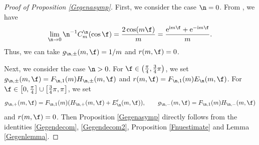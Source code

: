 \begin{proof}[Proof of Proposition \ref{Gegenasymp}]
First, we consider the case $\n=0$. From \cite[equation~(4.28)]{BKO}, we have
\begin{align*}
\lim_{\n\to 0}\n^{-1}C_m^{\n}(\cos\f)=\frac{2\cos (m\f)}{m}=\frac{{\rm e}^{{\rm i}m\f}+{\rm e}^{-{\rm i}m\f}}{m}.
\end{align*}
Thus, we can take $g_{\n,\pm}(m,\f)=1/m$ and $r(m,\f)=0$.

Next, we consider the case $\n>0$. For $\f\in \bigl(\frac{\pi}{4}, \frac{3}{4}\pi\bigr)$, we set $g_{\n,\pm}(m,\f)=F_{\n,1}(m)H_{\n,\pm}(m,\f)$ and $r(m,\f)=F_{\n,1}(m)E_{\n}(m,\f)$. For $\f\in \bigl[0,\frac{\pi}{4}\bigr]\cup \bigl[\frac{3}{4}\pi,\pi\bigr]$, we set
\begin{align*}
g_{\n,+}(m,\f)=F_{\n,1}(m)(H_{\n,+}(m,\f)+E_{\n}'(m,\f)),\qquad g_{\n,-}(m,\f)=F_{\n,1}(m)H_{\n,-}(m,\f)
\end{align*}
and $r(m,\f)=0$. Then Proposition \ref{Gegenasymp} directly follows from the identities \eqref{Gegendecom}, \eqref{Gegendecom2}, Proposition \ref{Fnuestimate} and Lemma \ref{Gegenlemma}.
\end{proof}
